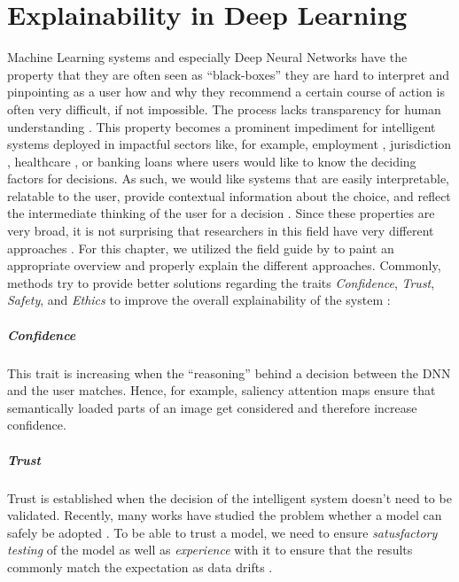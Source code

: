 \chapter{Explainability in Deep Learning} 
\label{sec:Explainability} 

Machine Learning systems and especially Deep Neural Networks have the property that they are often seen as ``black-boxes'' \ie they are hard to interpret and pinpointing as a user how and why they recommend a certain course of action is often very difficult, if not impossible. The process lacks transparency for human understanding \citep{sun2020fixing}. This property becomes a prominent impediment for intelligent systems deployed in impactful sectors like, for example, employment \citep{QinZXZJCX18, CaiSJLQXZ20, ZhaoHCFZ18}, jurisdiction \citep{GuoHQX019}, healthcare \citep{Pasa2019}, or banking loans where users would like to know the deciding factors for decisions. As such, we would like systems that are easily interpretable, relatable to the user, provide contextual information about the choice, and reflect the intermediate thinking of the user for a decision \citep{xie2020explainable}. Since these properties are very broad, it is not surprising that researchers in this field have very different approaches \citep{xie2020explainable}. For this chapter, we utilized the field guide by \citet{xie2020explainable} to paint an appropriate overview and properly explain the different approaches. Commonly, methods try to provide better solutions regarding the traits \emph{Confidence}, \emph{Trust}, \emph{Safety}, and \emph{Ethics} to improve the overall explainability of the system \citep{xie2020explainable}:

\paragraph{Confidence}
This trait is increasing when the ``reasoning'' behind a decision between the DNN and the user matches. Hence, for example, saliency attention maps \citep{ParkHARSDR18, HudsonM18} ensure that semantically loaded parts of an image get considered and therefore increase confidence.

\paragraph{Trust} 
Trust is established when the decision of the intelligent system doesn't need to be validated. Recently, many works have studied the problem whether a model can safely be adopted \citep{GharibLBADB18, VarshneyA17, JiangKGG18}. To be able to trust a model, we need to ensure \emph{satusfactory testing} of the model as well as \emph{experience} with it to ensure that the results commonly match the expectation as data drifts \citep{xie2020explainable}.

